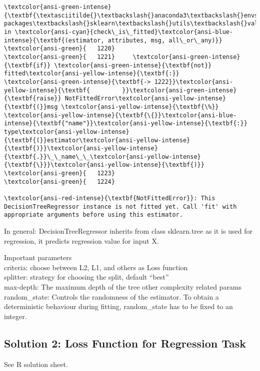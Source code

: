 \documentclass[11pt]{article}
\begin{document}
\begin{Verbatim}[commandchars=\\\{\}, frame=single, framerule=2mm, rulecolor=\color{outerrorbackground}]
\textcolor{ansi-green-intense}{\textbf{\textasciitilde{}\textbackslash{}anaconda3\textbackslash{}envs\textbackslash{}I2ML\_env\textbackslash{}lib\textbackslash{}site-packages\textbackslash{}sklearn\textbackslash{}utils\textbackslash{}validation.py}} in \textcolor{ansi-cyan}{check\_is\_fitted}\textcolor{ansi-blue-intense}{\textbf{(estimator, attributes, msg, all\_or\_any)}}
\textcolor{ansi-green}{   1220} 
\textcolor{ansi-green}{   1221}     \textcolor{ansi-green-intense}{\textbf{if}} \textcolor{ansi-green-intense}{\textbf{not}} fitted\textcolor{ansi-yellow-intense}{\textbf{:}}
\textcolor{ansi-green-intense}{\textbf{-> 1222}}\textcolor{ansi-yellow-intense}{\textbf{         }}\textcolor{ansi-green-intense}{\textbf{raise}} NotFittedError\textcolor{ansi-yellow-intense}{\textbf{(}}msg \textcolor{ansi-yellow-intense}{\textbf{\%}} \textcolor{ansi-yellow-intense}{\textbf{\{}}\textcolor{ansi-blue-intense}{\textbf{"name"}}\textcolor{ansi-yellow-intense}{\textbf{:}} type\textcolor{ansi-yellow-intense}{\textbf{(}}estimator\textcolor{ansi-yellow-intense}{\textbf{)}}\textcolor{ansi-yellow-intense}{\textbf{.}}\_\_name\_\_\textcolor{ansi-yellow-intense}{\textbf{\}}}\textcolor{ansi-yellow-intense}{\textbf{)}}
\textcolor{ansi-green}{   1223} 
\textcolor{ansi-green}{   1224} 

\textcolor{ansi-red-intense}{\textbf{NotFittedError}}: This DecisionTreeRegressor instance is not fitted yet. Call 'fit' with appropriate arguments before using this estimator.
    \end{Verbatim}

    In general: DecisionTreeRegressor inherits from class sklearn.tree as it
is used for regression, it predicts regression value for input X.

    Important parameters\\
    criteria: choose between L2, L1, and others as Loss function \\
	splitter: strategy for choosing the split, default ``best'' \\
	max-depth: The maximum depth of the tree other complexity related params \\
	random\_state: Controls the randomness of the estimator. To obtain a deterministic behaviour during fitting, random\_state has to be fixed to an integer.
	
\subsection*{Solution 2: Loss Function for Regression Task}
See R solution sheet.
\end{document}
